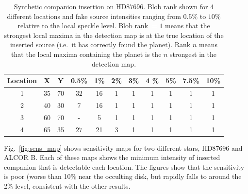 \documentclass[12pt,pdftex,preprint]{aastex}
\newcommand{\fig}[1]{Fig.\ \ref{fig:#1}}
\begin{document}
\begin{table}
\small
\begin{center}
\begin{tabular} { | c | c | c || c | c | c | c | c | c | c | c | } \hline
 Location & X & Y & 0.5\% &  1\% &  2\%  &  3\%  & 4 \% & 5\% & 7.5\%
 & 10\% \\ \hline \hline
 1    &   35  &    70  &   32  &    16  &    1  &     1  &     1  &
 1   &    1  &     1\\ \hline
2    &   40  &    30  &  7  &    16  &    1  &     1  &     1  &     1
 &    1  &     1\\ \hline
3    &   60  &    70  &   -  &    5  &    1  &     1  &     1  &     1
 &    1  &     1\\ \hline
 4    &   65  &   35  &   27  &   21  &    3  &     1  &     1  &
1   &    1  &     1\\ \hline
\end{tabular}
\end{center}
\caption{Synthetic companion insertion on HD87696. Blob rank shown for
 4 different locations and fake source intensities ranging from
 $0.5\%$ to $10\%$ relative to the local speckle level. Blob rank
$=1$ means that the strongest local
 maxima in the detection map is at the true location of the inserted
 source (i.e.~it has correctly found the planet). Rank $n$ means
 that the local maxima containing the planet is the $n$ strongest in
 the detection map. }
\label{tab:hd87696}
\end{table}

\fig{sens_map} shows sensitivity maps for two different stars, HD87696
and ALCOR B. Each of these maps shows the minimum intensity of
inserted companion that is detectable each location. The figures show
that the sensitivity is poor (worse than 10\% near the occulting disk,
but rapidly falls to around the 2\% level, consistent with the other
results. 
\end{document}
